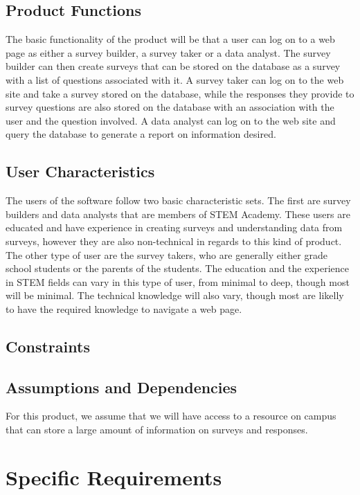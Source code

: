 \documentclass[letterpaper,10pt,titlepage, draftclsnofoot,onecolumn]{IEEEtran}
\begin{document}
\subsection{Product Functions}
The basic functionality of the product will be that a user can log on to a web page as either a survey builder,
a survey taker or a data analyst. The survey builder can then create surveys that can be stored on the database as a survey with a
list of questions associated with it. A survey taker can log on to the web site and take a survey stored on the database,
while the responses they provide to survey questions are also stored on the database with an association with the user
and the question involved. A data analyst can log on to the web site and query the database to generate a report on
information desired.
\subsection{User Characteristics}
The users of the software follow two basic characteristic sets. The first are survey builders and data analysts that are members of
STEM Academy. These users are educated and have experience in creating surveys and understanding data from surveys,
however they are also non-technical in regards to this kind of product. The other type of user are the survey takers, who are
generally either grade school students or the parents of the students. The education and the experience in STEM fields
can vary in this type of user, from minimal to deep, though most will be minimal. The technical knowledge will also vary, though
most are likelly to have the required knowledge to navigate a web page.
\subsection{Constraints}
\subsection{Assumptions and Dependencies}
For this product, we assume that we will have access to a resource on campus that can store a large amount of information on
surveys and responses. %
\section{Specific Requirements}
\end{document}
